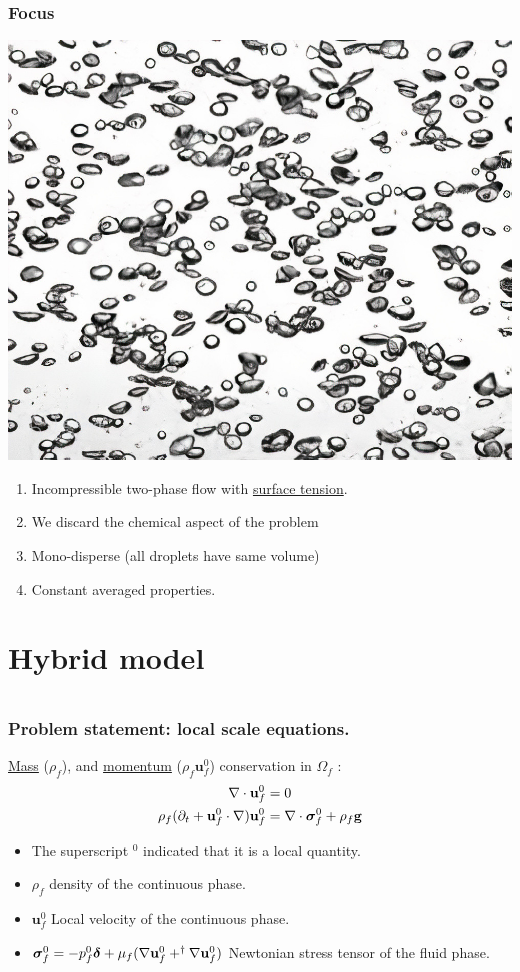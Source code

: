 \documentclass{sintefbeamer}
\begin{document}
\begin{frame}
  \frametitle{Focus }
  \centering
  \includegraphics[height=0.3\textwidth]{image/bubbles_4x.jpg}

  \begin{enumerate}
    \item Incompressible two-phase flow with \underline{surface tension}. 
    \item We discard the chemical aspect of the problem 
    \item Mono-disperse (all droplets have same volume)
    \item Constant averaged properties.   
  \end{enumerate}
  
\end{frame}


\section{Hybrid model}
\section*{}



\begin{frame}
  \frametitle{Problem statement: local scale equations.}
  \underline{Mass} ($\rho_f$), and \underline{momentum} ($\rho_f \textbf{u}_f^0$) conservation in $\Omega_f$ :
\begin{align}
  \mathbf{\nabla}\cdot  \textbf{u}_f^0
  &= 
  0
  \\
  \rho_f (\partial_t  + \textbf{u}_f^0 \cdot \mathbf{\nabla})
  \textbf{u}_f^0  
  &= 
  \mathbf{\nabla}\cdot  \bm{\sigma}_f^0 
  + \rho_f \textbf{g}
\end{align}
\begin{itemize}
    \item The superscript $^0$ indicated that it is a local quantity.
    \item $\rho_f$  density of the continuous phase. 
    \item $\textbf{u}_f^0$ Local velocity of the continuous phase.
    \item $\bm\sigma_f^0 = -p_f^0 \bm\delta + \mu_f (\mathbf{\nabla} \textbf{u}_f^0+^\dagger\mathbf{\nabla} \textbf{u}_f^0)$ Newtonian stress tensor of the fluid phase. 
\end{itemize}
\end{frame}
\end{document}
